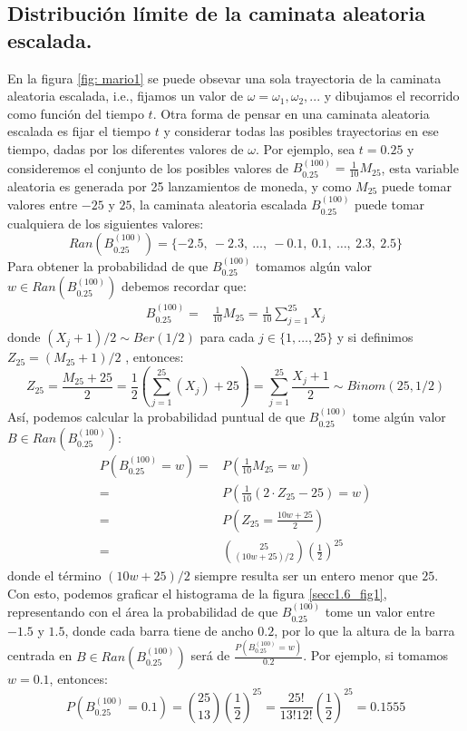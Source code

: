 \documentclass[11pt,notitlepage]{article}
\begin{document}
\subsection{Distribución límite de la caminata aleatoria escalada.}

En la figura \ref{fig: mario1} se puede obsevar una sola trayectoria de la caminata aleatoria escalada, i.e., fijamos un valor de $\omega = \omega_1, \omega_2, ...$ y dibujamos el recorrido como función del tiempo $t$. Otra forma de pensar en una caminata aleatoria escalada es fijar el tiempo $t$ y considerar todas las posibles trayectorias en ese tiempo, dadas por los diferentes valores de $\omega$. Por ejemplo, sea $t=0.25$ y consideremos el conjunto de los posibles valores de $B^{(100)}_{0.25} = \frac{1}{10}M_{25}$, esta variable aleatoria es generada por 25 lanzamientos de moneda, y como $M_{25}$ puede tomar valores entre $-25$ y $25$, la caminata aleatoria escalada $B^{(100)}_{0.25}$ puede tomar cualquiera de los siguientes valores: \[ Ran\left ( B^{(100)}_{0.25} \right ) = \{ -2.5,\ -2.3, \ \dots, \ -0.1, \ 0.1, \ \dots, \ 2.3,  \ 2.5 \} \]
Para obtener la probabilidad de que $B^{(100)}_{0.25}$ tomamos algún valor $w \in Ran(B^{(100)}_{0.25}) $ debemos recordar que:
\begin{align*}
B^{(100)}_{0.25} = & \frac{1}{10}M_{25} = \frac{1}{10}\sum_{j=1}^{25}X_j
\end{align*}
donde $(X_j + 1)/2 \sim Ber(1/2)$ para cada $j\in \{1, \dots, 25\}$ y si definimos $Z_{25} = (M_{25} + 1)/2$ , entonces:
\[ Z_{25} = \frac{M_{25} + 25}{2} =\frac{1}{2} \left(\sum_{j=1}^{25}(X_j)+ 25 \right)  =\sum_{j=1}^{25}\frac{X_j + 1}{2} \sim Binom(25, 1/2)  \]
Así, podemos calcular la probabilidad puntual de que  $B^{(100)}_{0.25}$ tome algún valor $B \in Ran(B^{(100)}_0.25) $:
\begin{align*}
    P(B^{(100)}_{0.25} = w) = & P \left( \frac{1}{10}M_{25} = w\right)\\
    = & P \left( \frac{1}{10} ( 2\cdot Z_{25} - 25) = w \right)\\
    = & P \left(Z_{25} = \frac{10w + 25}{2} \right)\\
    = & \binom{25}{(10w + 25)/2} \left(\frac{1}{2}\right)^{25}
\end{align*}
donde el término $(10w + 25)/2$ siempre resulta ser un entero menor que $25$. Con esto, podemos graficar el histograma de la figura \ref{secc1.6_fig1}, representando con el área la probabilidad de que $B^{(100)}_{0.25}$ tome un valor entre $-1.5$ y $1.5$, donde cada barra tiene de ancho $0.2$, por lo que la altura de la barra centrada en $B \in Ran(B^{(100)}_{0.25}) $ será de $\frac{P(B^{(100)}_{0.25} = w)}{0.2}$. Por ejemplo, si tomamos $w= 0.1$, entonces:
\begin{equation}\label{eq:mariobino}
  P (B^{(100)}_{0.25} = 0.1) = \binom{25}{13} \left(\frac{1}{2}\right)^{25} = \frac{25!}{13!12!} \left(\frac{1}{2}\right)^{25} = 0.1555  
\end{equation}
\end{document}
